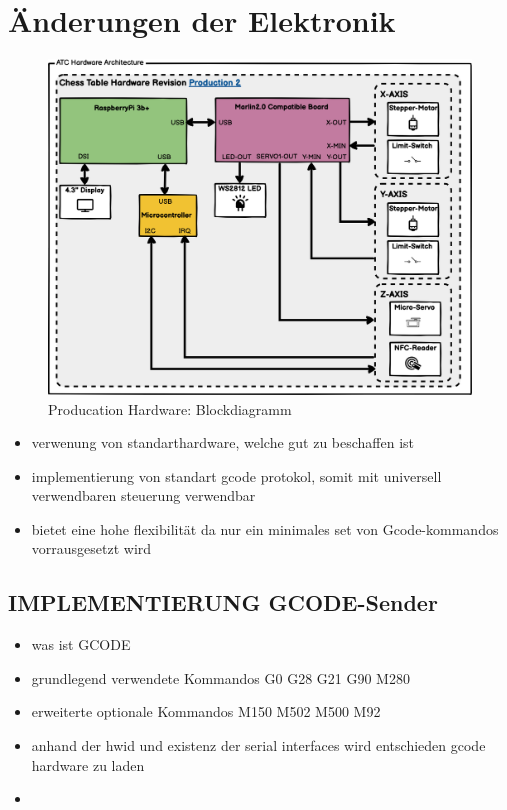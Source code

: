 \hypertarget{uxe4nderungen-der-elektronik}{%
\section{Änderungen der Elektronik}\label{uxe4nderungen-der-elektronik}}

\begin{figure}
\centering
\includegraphics{images/ATC_Hardware_Architecture_PROD.png}
\caption{Producation Hardware: Blockdiagramm}
\end{figure}

\begin{itemize}
\tightlist
\item
  verwenung von standarthardware, welche gut zu beschaffen ist
\item
  implementierung von standart gcode protokol, somit mit universell
  verwendbaren steuerung verwendbar
\item
  bietet eine hohe flexibilität da nur ein minimales set von
  Gcode-kommandos vorrausgesetzt wird
\end{itemize}

\hypertarget{implementierung-gcode-sender}{%
\subsection{IMPLEMENTIERUNG
GCODE-Sender}\label{implementierung-gcode-sender}}

\begin{itemize}
\item
  was ist GCODE
\item
  grundlegend verwendete Kommandos G0 G28 G21 G90 M280
\item
  erweiterte optionale Kommandos M150 M502 M500 M92
\item
  anhand der hwid und existenz der serial interfaces wird entschieden
  gcode hardware zu laden
\item
\end{itemize}

